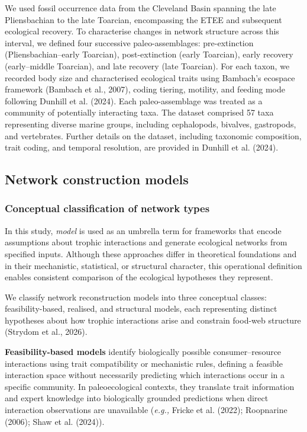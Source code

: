 \documentclass[
]{article}
\begin{document}
We used fossil occurrence data from the Cleveland Basin spanning the
late Pliensbachian to the late Toarcian, encompassing the ETEE and
subsequent ecological recovery. To characterise changes in network
structure across this interval, we defined four successive
paleo-assemblages: pre-extinction (Pliensbachian--early Toarcian),
post-extinction (early Toarcian), early recovery (early--middle
Toarcian), and late recovery (late Toarcian). For each taxon, we
recorded body size and characterised ecological traits using Bambach's
ecospace framework (Bambach et al., 2007), coding tiering, motility, and
feeding mode following Dunhill et al. (2024). Each paleo-assemblage was
treated as a community of potentially interacting taxa. The dataset
comprised 57 taxa representing diverse marine groups, including
cephalopods, bivalves, gastropods, and vertebrates. Further details on
the dataset, including taxonomic composition, trait coding, and temporal
resolution, are provided in Dunhill et al. (2024).

\subsection{Network construction
models}\label{network-construction-models}

\subsubsection{Conceptual classification of network
types}\label{conceptual-classification-of-network-types}

In this study, \emph{model} is used as an umbrella term for frameworks
that encode assumptions about trophic interactions and generate
ecological networks from specified inputs. Although these approaches
differ in theoretical foundations and in their mechanistic, statistical,
or structural character, this operational definition enables consistent
comparison of the ecological hypotheses they represent.

We classify network reconstruction models into three conceptual classes:
feasibility-based, realised, and structural models, each representing
distinct hypotheses about how trophic interactions arise and constrain
food-web structure (Strydom et al., 2026).

\textbf{Feasibility-based models} identify biologically possible
consumer--resource interactions using trait compatibility or mechanistic
rules, defining a feasible interaction space without necessarily
predicting which interactions occur in a specific community. In
paleoecological contexts, they translate trait information and expert
knowledge into biologically grounded predictions when direct interaction
observations are unavailable (\emph{e.g.,} Fricke et al. (2022);
Roopnarine (2006); Shaw et al. (2024)).
\end{document}
